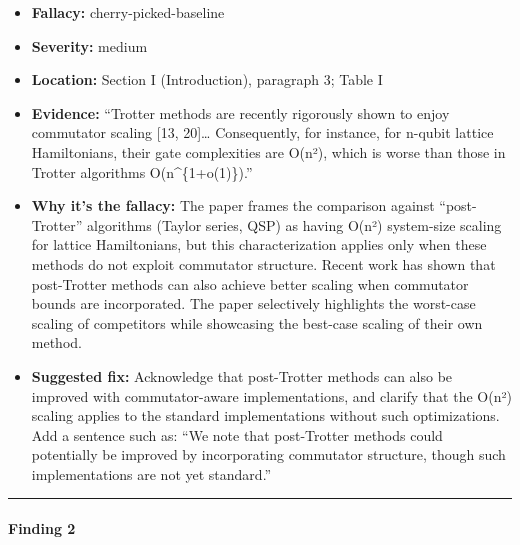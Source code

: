 \documentclass[10pt,letterpaper]{article}
\providecommand{\tightlist}{\setlength{\itemsep}{0pt}\setlength{\parskip}{0pt}}
\begin{document}
\begin{itemize}
\tightlist
\item
  \textbf{Fallacy:} cherry-picked-baseline
\item
  \textbf{Severity:} medium
\item
  \textbf{Location:} Section I (Introduction), paragraph 3; Table I
\item
  \textbf{Evidence:} ``Trotter methods are recently rigorously shown to enjoy commutator scaling {[}13, 20{]}\ldots{} Consequently, for instance, for n-qubit lattice Hamiltonians, their gate complexities are O(n²), which is worse than those in Trotter algorithms O(n\^{}\{1+o(1)\}).''
\item
  \textbf{Why it's the fallacy:} The paper frames the comparison against ``post-Trotter'' algorithms (Taylor series, QSP) as having O(n²) system-size scaling for lattice Hamiltonians, but this characterization applies only when these methods do not exploit commutator structure. Recent work has shown that post-Trotter methods can also achieve better scaling when commutator bounds are incorporated. The paper selectively highlights the worst-case scaling of competitors while showcasing the best-case scaling of their own method.
\item
  \textbf{Suggested fix:} Acknowledge that post-Trotter methods can also be improved with commutator-aware implementations, and clarify that the O(n²) scaling applies to the standard implementations without such optimizations. Add a sentence such as: ``We note that post-Trotter methods could potentially be improved by incorporating commutator structure, though such implementations are not yet standard.''
\end{itemize}

\begin{center}\rule{0.5\linewidth}{0.5pt}\end{center}

\hypertarget{finding-2}{%
\paragraph{Finding 2}\label{finding-2}}
\end{document}
